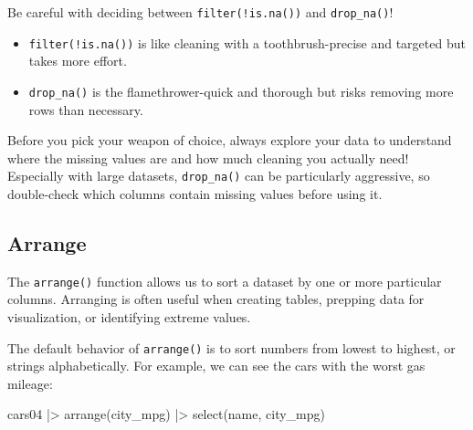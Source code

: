 \documentclass[
  letterpaper,
]{book}
\newenvironment{Shaded}{\begin{snugshade}}{\end{snugshade}}
\newcommand{\FunctionTok}[1]{\textcolor[rgb]{0.28,0.35,0.67}{#1}}
\newcommand{\NormalTok}[1]{\textcolor[rgb]{0.00,0.23,0.31}{#1}}
\newcommand{\SpecialCharTok}[1]{\textcolor[rgb]{0.37,0.37,0.37}{#1}}
\providecommand{\tightlist}{%
  \setlength{\itemsep}{0pt}\setlength{\parskip}{0pt}}\usepackage{longtable,booktabs,array}
\begin{document}
\begin{tcolorbox}[enhanced jigsaw, colframe=quarto-callout-tip-color-frame, breakable, arc=.35mm, bottomtitle=1mm, bottomrule=.15mm, colbacktitle=quarto-callout-tip-color!10!white, rightrule=.15mm, colback=white, opacityback=0, opacitybacktitle=0.6, coltitle=black, left=2mm, toptitle=1mm, toprule=.15mm, titlerule=0mm, leftrule=.75mm, title=\textcolor{quarto-callout-tip-color}{\faLightbulb}\hspace{0.5em}{Tip from the Helpdesk: Cleaning with a Toothbrush or a Flamethrower?}]

Be careful with deciding between \texttt{filter(!is.na())} and
\texttt{drop\_na()}!

\begin{itemize}
\tightlist
\item
  \texttt{filter(!is.na())} is like cleaning with a toothbrush-precise
  and targeted but takes more effort.
\item
  \texttt{drop\_na()} is the flamethrower-quick and thorough but risks
  removing more rows than necessary.
\end{itemize}

Before you pick your weapon of choice, always explore your data to
understand where the missing values are and how much cleaning you
actually need! Especially with large datasets, \texttt{drop\_na()} can
be particularly aggressive, so double-check which columns contain
missing values before using it.

\end{tcolorbox}

\subsection{Arrange}\label{arrange}

The \texttt{arrange()} function allows us to sort a dataset by one or
more particular columns. Arranging is often useful when creating tables,
prepping data for visualization, or identifying extreme values.

The default behavior of \texttt{arrange()} is to sort numbers from
lowest to highest, or strings alphabetically. For example, we can see
the cars with the worst gas mileage:

\begin{Shaded}
\begin{Highlighting}[]
\NormalTok{cars04 }\SpecialCharTok{|\textgreater{}} 
  \FunctionTok{arrange}\NormalTok{(city\_mpg) }\SpecialCharTok{|\textgreater{}} 
  \FunctionTok{select}\NormalTok{(name, }
\NormalTok{         city\_mpg)}
\end{Highlighting}
\end{Shaded}
\end{document}
